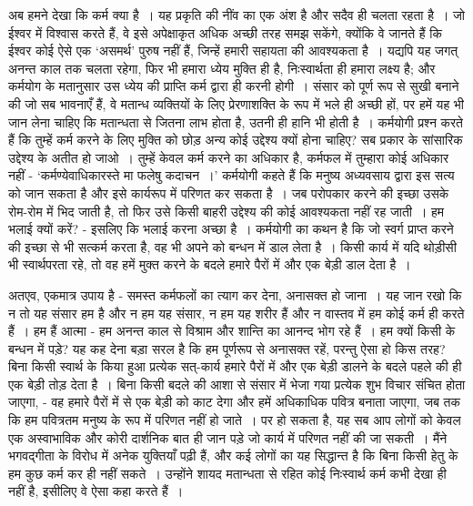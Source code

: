 अब हमने देखा कि कर्म क्या है~। यह प्रकृति की नींव का एक अंश है और सदैव ही चलता रहता है~। जो ईश्वर में विश्वास करते हैं, वे इसे अपेक्षाकृत अधिक अच्छी तरह समझ सकेंगे, क्योंकि वे जानते हैं कि ईश्वर कोई ऐसे एक ‘असमर्थ’ पुरुष नहीं हैं, जिन्हें हमारी सहायता की आवश्यकता है~। यद्यपि यह जगत् अनन्त काल तक चलता रहेगा, फिर भी हमारा ध्येय मुक्ति ही है, निःस्वार्थता ही हमारा लक्ष्य है; और कर्मयोग के मतानुसार उस ध्येय की प्राप्ति कर्म द्वारा ही करनी होगी~। संसार को पूर्ण रूप से सुखी बनाने की जो सब भावनाएँ हैं, वे मतान्ध व्यक्तियों के लिए प्रेरणाशक्ति के रूप में भले ही अच्छी हों, पर हमें यह भी जान लेना चाहिए कि मतान्धता से जितना लाभ होता है, उतनी ही हानि भी होती है~। कर्मयोगी प्रश्न करते हैं कि तुम्हें कर्म करने के लिए मुक्ति को छोड़ अन्य कोई उद्देश्य क्यों होना चाहिए? सब प्रकार के सांसारिक उद्देश्य के अतीत हो जाओ~। तुम्हें केवल कर्म करने का अधिकार है, कर्मफल में तुम्हारा कोई अधिकार नहीं - ‘कर्मण्येवाधिकारस्ते मा फलेषु कदाचन~।’ कर्मयोगी कहते हैं कि मनुष्य अध्यवसाय द्वारा इस सत्य को जान सकता है और इसे कार्यरूप में परिणत कर सकता है~। जब परोपकार करने की इच्छा उसके रोम-रोम में भिद जाती है, तो फिर उसे किसी बाहरी उद्देश्य की कोई आवश्यकता नहीं रह जाती~। हम भलाई क्यों करें? - इसलिए कि भलाई करना अच्छा है~। कर्मयोगी का कथन है कि जो स्वर्ग प्राप्त करने की इच्छा से भी सत्कर्म करता है, वह भी अपने को बन्धन में डाल लेता है~। किसी कार्य में यदि थोड़ीसी भी स्वार्थपरता रहे, तो वह हमें मुक्त करने के बदले हमारे पैरों में और एक बेड़ी डाल देता है~।

अतएव, एकमात्र उपाय है - समस्त कर्मफलों का त्याग कर देना, अनासक्त हो जाना~। यह जान रखो कि न तो यह संसार हम है और न हम यह संसार, न हम यह शरीर हैं और न वास्तव में हम कोई कर्म ही करते हैं~। हम हैं आत्मा - हम अनन्त काल से विश्राम और शान्ति का आनन्द भोग रहे हैं~। हम क्यों किसी के बन्धन में पड़े? यह कह देना बड़ा सरल है कि हम पूर्णरूप से अनासक्त रहें, परन्तु ऐसा हो किस तरह? बिना किसी स्वार्थ के किया हुआ प्रत्येक सत्-कार्य हमारे पैरों में और एक बेड़ी डालने के बदले पहले की ही एक बेड़ी तोड़ देता है~। बिना किसी बदले की आशा से संसार में भेजा गया प्रत्येक शुभ विचार संचित होता जाएगा, - वह हमारे पैरों में से एक बेड़ी को काट देगा और हमें अधिकाधिक पवित्र बनाता जाएगा, जब तक कि हम पवित्रतम मनुष्य के रूप में परिणत नहीं हो जाते~। पर हो सकता है, यह सब आप लोगों को केवल एक अस्वाभाविक और कोरी दार्शनिक बात ही जान पड़े जो कार्य में परिणत नहीं की जा सकती~। मैंने भगवद्गीता के विरोध में अनेक युक्तियाँ पढ़ी हैं, और कई लोगों का यह सिद्धान्त है कि बिना किसी हेतु के हम कुछ कर्म कर ही नहीं सकते~। उन्होंने शायद मतान्धता से रहित कोई निःस्वार्थ कर्म कभी देखा ही नहीं है, इसीलिए वे ऐसा कहा करते हैं~।

